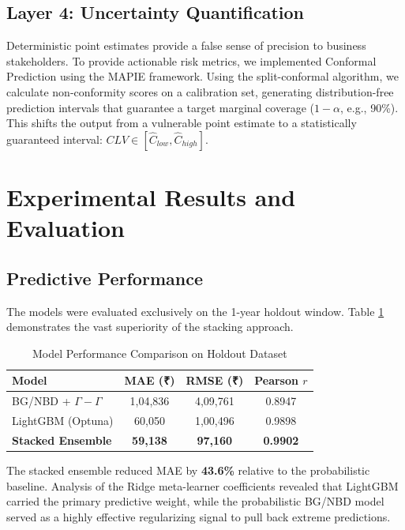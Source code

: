 \documentclass[10pt,conference]{IEEEtran}
\begin{document}
\subsection{Layer 4: Uncertainty Quantification}
Deterministic point estimates provide a false sense of precision to business stakeholders. To provide actionable risk metrics, we implemented Conformal Prediction using the MAPIE framework. Using the split-conformal algorithm, we calculate non-conformity scores on a calibration set, generating distribution-free prediction intervals that guarantee a target marginal coverage ($1-\alpha$, e.g., 90\%). This shifts the output from a vulnerable point estimate to a statistically guaranteed interval: $CLV \in [\hat{C}_{low}, \hat{C}_{high}]$.

\section{Experimental Results and Evaluation}

\subsection{Predictive Performance}
The models were evaluated exclusively on the 1-year holdout window. Table \ref{tab:performance} demonstrates the vast superiority of the stacking approach.

\begin{table}[htbp]
\caption{Model Performance Comparison on Holdout Dataset}
\begin{center}
\begin{tabular}{l c c c}
\toprule
\textbf{Model} & \textbf{MAE (₹)} & \textbf{RMSE (₹)} & \textbf{Pearson $r$} \\
\midrule
BG/NBD + $\Gamma-\Gamma$ & 1,04,836 & 4,09,761 & 0.8947 \\
LightGBM (Optuna) & 60,050 & 1,00,496 & 0.9898 \\
\textbf{Stacked Ensemble} & \textbf{59,138} & \textbf{97,160} & \textbf{0.9902} \\
\bottomrule
\end{tabular}
\label{tab:performance}
\end{center}
\end{table}

The stacked ensemble reduced MAE by \textbf{43.6\%} relative to the probabilistic baseline. Analysis of the Ridge meta-learner coefficients revealed that LightGBM carried the primary predictive weight, while the probabilistic BG/NBD model served as a highly effective regularizing signal to pull back extreme predictions.
\end{document}
